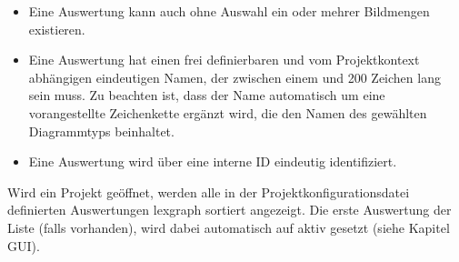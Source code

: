 	\begin{itemize}

		\item Eine Auswertung kann auch ohne Auswahl ein oder mehrer Bildmengen existieren. 

		\item Eine Auswertung hat einen frei definierbaren und vom Projektkontext abhängigen eindeutigen Namen, der zwischen einem und 200 Zeichen lang sein muss. Zu beachten ist, dass der Name automatisch um eine vorangestellte Zeichenkette ergänzt wird, die den Namen des gewählten Diagrammtyps beinhaltet.

		\item Eine Auswertung wird über eine interne ID eindeutig identifiziert.

	\end{itemize}

	Wird ein Projekt geöffnet, werden alle in der Projektkonfigurationsdatei definierten Auswertungen \gls{lexgraph} sortiert angezeigt. Die erste Auswertung der Liste (falls vorhanden), wird dabei automatisch auf aktiv gesetzt (siehe Kapitel GUI).

